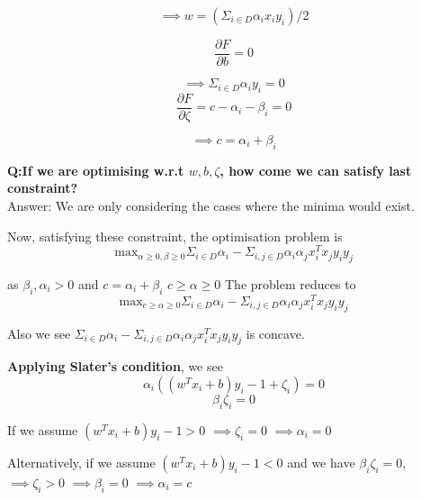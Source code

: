 \documentclass[11pt, twosides]{article}
\begin{document}
\begin{equation}
    \implies w=(\Sigma_{i\in D} \alpha_ix_{i}y_i)/2
\end{equation}

\begin{equation}
    \frac{\partial F}{\partial b}=0
\end{equation}

\begin{equation}
    \implies \Sigma_{i\in D} \alpha_{i}y_i=0
\end{equation}\begin{equation}
    \frac{\partial F}{\partial \zeta}=c -\alpha_i-\beta_i=0
\end{equation}

\begin{equation}
    \implies c=\alpha_i+\beta_i
\end{equation}

\textbf{Q:If we are optimising w.r.t $w,b,\zeta$, how come we can satisfy last constraint?}\\
Answer: \color{blue} We are only considering the cases where the minima would exist.
\color{black}

Now, satisfying these constraint, the optimisation problem is
\begin{equation}
    \text{max}_{\alpha\geq 0, \beta \geq 0} \Sigma_{i\in D}\alpha_i-\Sigma_{i,j\in D}\alpha_{i}\alpha_jx^T_ix_jy_iy_j
\end{equation}

as $\beta_i,\alpha_i>0$ and  $c=\alpha_i+\beta_i$ \implies $c\geq\alpha\geq0$
The problem reduces to
\begin{equation}
    \text{max}_{c\geq\alpha\geq0}  \Sigma_{i\in D}\alpha_i-\Sigma_{i,j\in D}\alpha_{i}\alpha_jx^T_ix_jy_iy_j
\end{equation}

Also we see $\Sigma_{i\in D}\alpha_i-\Sigma_{i,j\in D}\alpha_{i}\alpha_jx^T_ix_jy_iy_j$ is concave.

\textbf{Applying Slater's condition}, we see 
\begin{equation}
    \alpha_i((w^Tx_i+b)y_i-1+\zeta_i)=0
\end{equation}
\begin{equation}
    \beta_i\zeta_i=0
\end{equation}

If we assume $(w^Tx_i+b)y_i-1>0$ 
$\implies \zeta_i=0$ $\implies \alpha_i=0$

Alternatively, if we assume $(w^Tx_i+b)y_i-1<0$ and we have $\beta_i\zeta_i=0$,
$\implies \zeta_i>0$ $\implies \beta_i=0$ $\implies \alpha_i=c$
\end{document}
